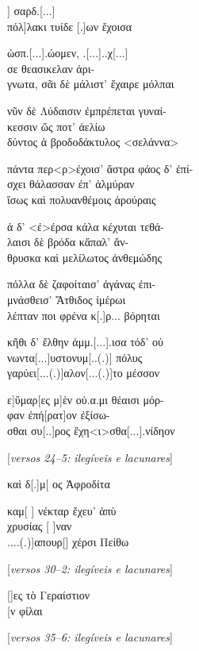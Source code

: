 \begin{gkverse}
] σαρδ.[...]\\
     πόλ]λακι τυίδε [.]ων ἔχοισα

ὠσπ.[...].ώομεν, .[...]..χ[...]\\
    σε \dagger{}θεασικελαν ἀρι-\\
      γνωτα\dagger{}, σᾶι δὲ μάλιστ’ ἔχαιρε μόλπαι

νῦν δὲ Λύδαισιν ἐμπρέπεται γυναί-\\
    κεσσιν ὤς ποτ’ ἀελίω\\
      δύντος ἀ βροδοδάκτυλος <σελάννα>

πάντα περ<ρ>έχοισ’ ἄστρα φάος δ’ ἐπί-\\
    σχει θάλασσαν ἐπ’ ἀλμύραν\\
      ἴσως καὶ πολυανθέμοις ἀρούραις

ἀ δ’ <ἐ>έρσα κάλα κέχυται τεθά-\\
    λαισι δὲ βρόδα κἄπαλ’ ἄν-\\
      θρυσκα καὶ μελίλωτος ἀνθεμώδης 

πόλλα δὲ ζαφοίταισ’ ἀγάνας ἐπι-\\
    μνάσθεισ’ Ἄτθιδος ἰμέρωι\\
      λέπταν ποι φρένα κ[.]ρ... βόρηται

κῆθι δ’ ἔλθην ἀμμ.[...].ισα τόδ’ οὐ\\
    νωντα[...]υστονυμ[..(.)] πόλυς\\
      γαρύει[...(.)]αλον[...(.)]το μέσσον

ε]ὔμαρ[ες μ]ὲν οὐ.α.μι θέαισι μόρ-\\
    φαν ἐπή[ρατ]ον ἐξίσω-\\
      σθαι συ[..]ρος ἔχη<ι>σθα[...].νίδηον

\textnormal{[\emph{versos 24--5: ilegíveis e lacunares}]}

      καὶ δ[.]μ{[}	\qquad		{]}ος Ἀφροδίτα

καμ[		\qquad	] νέκταρ ἔχευ’ ἀπὺ\\
    χρυσίας [		       ]ναν\\
      ....(.)]απουρ[\qquad		] χέρσι Πείθω

\textnormal{[\emph{versos 30--2: ilegíveis e lacunares}]}

[\qquad			]ες τὸ Γεραίστιον\\
    {[}\qquad			   {]}ν φίλαι

\textnormal{[\emph{versos 35--6: ilegíveis e lacunares}]}
\end{gkverse}

